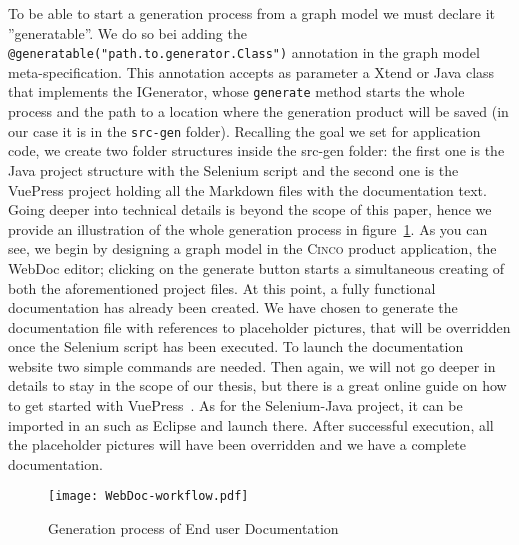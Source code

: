 To be able to start a generation process from a graph model we must declare it ''generatable''. We do so bei adding the \lstinline[language=MGL]{@generatable("path.to.generator.Class")} annotation in the graph model meta-specification. This annotation accepts as parameter a Xtend or Java class that implements the IGenerator, whose \lstinline{generate} method starts the whole process and the path to a location where the generation product will be saved (in our case it is in the \lstinline{src-gen} folder). Recalling the goal we set for application code, we create two folder structures inside the src-gen folder: the first one is the Java project structure with the Selenium script and the second one is the VuePress project holding all the Markdown files with the documentation text. Going deeper into technical details is beyond the scope of this paper, hence we provide an illustration of the whole generation process in figure~\ref{fig:WebDocWorkflow}. As you can see, we begin by designing a graph model in the \textsc{Cinco} product application, the WebDoc editor; clicking on the generate button starts a simultaneous creating of both the aforementioned project files. At this point, a fully functional documentation has already been created. We have chosen to generate the documentation file with references to placeholder pictures, that will be overridden once the Selenium script has been executed. To launch the documentation website two simple commands are needed. Then again, we will not go deeper in details to stay in the scope of our thesis, but there is a great online guide on how to get started with VuePress~\cite{vuepress}. As for the Selenium-Java project, it can be imported in an  such as Eclipse and launch there. After successful execution, all the placeholder pictures will have been overridden and we have a complete documentation.

\begin{figure}[t]
    \centering
    \texttt{[image: WebDoc-workflow.pdf]}
    \caption{Generation process of End user Documentation}
    \label{fig:WebDocWorkflow}
\end{figure}